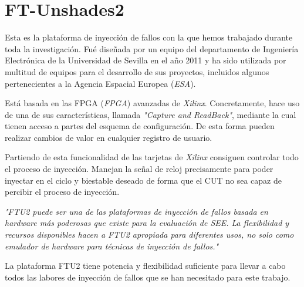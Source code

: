 \section{FT-Unshades2}
\label{sec:FT-Unshades2}
Esta es la plataforma de inyección de fallos con la que hemos trabajado durante
toda la investigación. Fué diseñada por un equipo del departamento de Ingeniería
Electrónica de la Universidad de Sevilla en el año 2011 \cite{FTU} y ha sido
utilizada por multitud de equipos para el desarrollo de sus proyectos, incluidos
algunos pertenecientes a la Agencia Espacial Europea (\textit{\acrshort{ESA}}).

Está basada en las \acrshort{FPGA} (\textit{\acrlong{FPGA}}) avanzadas de
\textit{Xilinx}. Concretamente, hace uso de una de sus características, llamada
\textit{"Capture and ReadBack"}, mediante la cual tienen acceso a partes del
esquema de configuración. De esta forma pueden realizar cambios de valor en 
cualquier registro de usuario.

Partiendo de esta funcionalidad de las tarjetas de \textit{Xilinx} consiguen
controlar todo el proceso de inyección. Manejan la señal de reloj precisamente
para poder inyectar en el ciclo y biestable deseado de forma que el \gls{CUT} no
sea capaz de percibir el proceso de inyección.

\vspace{0.3cm}
\textit{"FTU2 puede ser una de las plataformas de inyección de fallos basada en 
hardware más poderosas que existe para la evaluación de \gls{SEE}. La flexibilidad
y recursos disponibles hacen a FTU2 apropiada para diferentes usos, no solo como
emulador de hardware para técnicas de inyección de fallos."}
\vspace{-0.2cm}
{}
\vspace{0.3cm}

La plataforma FTU2 tiene potencia y flexibilidad suficiente para llevar a cabo
todos las labores de inyección de fallos que se han necesitado para este trabajo.

\endinput
